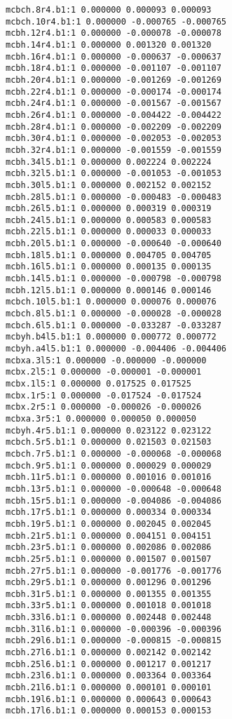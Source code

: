 \begin{verbatim}
mcbch.8r4.b1:1 0.000000 0.000093 0.000093
mcbch.10r4.b1:1 0.000000 -0.000765 -0.000765
mcbh.12r4.b1:1 0.000000 -0.000078 -0.000078
mcbh.14r4.b1:1 0.000000 0.001320 0.001320
mcbh.16r4.b1:1 0.000000 -0.000637 -0.000637
mcbh.18r4.b1:1 0.000000 -0.001107 -0.001107
mcbh.20r4.b1:1 0.000000 -0.001269 -0.001269
mcbh.22r4.b1:1 0.000000 -0.000174 -0.000174
mcbh.24r4.b1:1 0.000000 -0.001567 -0.001567
mcbh.26r4.b1:1 0.000000 -0.004422 -0.004422
mcbh.28r4.b1:1 0.000000 -0.002209 -0.002209
mcbh.30r4.b1:1 0.000000 -0.002053 -0.002053
mcbh.32r4.b1:1 0.000000 -0.001559 -0.001559
mcbh.34l5.b1:1 0.000000 0.002224 0.002224
mcbh.32l5.b1:1 0.000000 -0.001053 -0.001053
mcbh.30l5.b1:1 0.000000 0.002152 0.002152
mcbh.28l5.b1:1 0.000000 -0.000483 -0.000483
mcbh.26l5.b1:1 0.000000 0.000319 0.000319
mcbh.24l5.b1:1 0.000000 0.000583 0.000583
mcbh.22l5.b1:1 0.000000 0.000033 0.000033
mcbh.20l5.b1:1 0.000000 -0.000640 -0.000640
mcbh.18l5.b1:1 0.000000 0.004705 0.004705
mcbh.16l5.b1:1 0.000000 0.000135 0.000135
mcbh.14l5.b1:1 0.000000 -0.000798 -0.000798
mcbh.12l5.b1:1 0.000000 0.000146 0.000146
mcbch.10l5.b1:1 0.000000 0.000076 0.000076
mcbch.8l5.b1:1 0.000000 -0.000028 -0.000028
mcbch.6l5.b1:1 0.000000 -0.033287 -0.033287
mcbyh.b4l5.b1:1 0.000000 0.000772 0.000772
mcbyh.a4l5.b1:1 0.000000 -0.004406 -0.004406
mcbxa.3l5:1 0.000000 -0.000000 -0.000000
mcbx.2l5:1 0.000000 -0.000001 -0.000001
mcbx.1l5:1 0.000000 0.017525 0.017525
mcbx.1r5:1 0.000000 -0.017524 -0.017524
mcbx.2r5:1 0.000000 -0.000026 -0.000026
mcbxa.3r5:1 0.000000 0.000050 0.000050
mcbyh.4r5.b1:1 0.000000 0.023122 0.023122
mcbch.5r5.b1:1 0.000000 0.021503 0.021503
mcbch.7r5.b1:1 0.000000 -0.000068 -0.000068
mcbch.9r5.b1:1 0.000000 0.000029 0.000029
mcbh.11r5.b1:1 0.000000 0.001016 0.001016
mcbh.13r5.b1:1 0.000000 -0.000648 -0.000648
mcbh.15r5.b1:1 0.000000 -0.004086 -0.004086
mcbh.17r5.b1:1 0.000000 0.000334 0.000334
mcbh.19r5.b1:1 0.000000 0.002045 0.002045
mcbh.21r5.b1:1 0.000000 0.004151 0.004151
mcbh.23r5.b1:1 0.000000 0.002086 0.002086
mcbh.25r5.b1:1 0.000000 0.001507 0.001507
mcbh.27r5.b1:1 0.000000 -0.001776 -0.001776
mcbh.29r5.b1:1 0.000000 0.001296 0.001296
mcbh.31r5.b1:1 0.000000 0.001355 0.001355
mcbh.33r5.b1:1 0.000000 0.001018 0.001018
mcbh.33l6.b1:1 0.000000 0.002448 0.002448
mcbh.31l6.b1:1 0.000000 -0.000396 -0.000396
mcbh.29l6.b1:1 0.000000 -0.000815 -0.000815
mcbh.27l6.b1:1 0.000000 0.002142 0.002142
mcbh.25l6.b1:1 0.000000 0.001217 0.001217
mcbh.23l6.b1:1 0.000000 0.003364 0.003364
mcbh.21l6.b1:1 0.000000 0.000101 0.000101
mcbh.19l6.b1:1 0.000000 0.000643 0.000643
mcbh.17l6.b1:1 0.000000 0.000153 0.000153

\end{verbatim}
